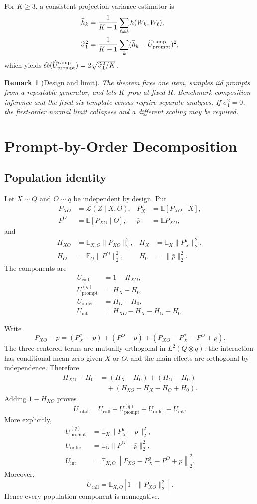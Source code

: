 \documentclass[letterpaper]{article}
\newtheorem{remark}{Remark}
\newcommand{\Law}{\mathcal L}
\newcommand{\E}{\mathbb E}
\newcommand{\1}{\mathbf 1}
\newcommand{\Up}{U_{\mathrm{prompt}}}
\newcommand{\Uc}{U_{\mathrm{call}}}
\newcommand{\Uo}{U_{\mathrm{order}}}
\newcommand{\Ui}{U_{\mathrm{int}}}
\newcommand{\Ut}{U_{\mathrm{total}}}
\begin{document}
For $K\ge3$, a consistent projection-variance estimator is
\begin{align}
\bar h_k&=\frac1{K-1}\sum_{\ell\ne k}h(W_k,W_\ell),\\
\widehat\sigma_1^2
&=\frac1{K-1}\sum_k(\bar h_k-\widehat\Up^{\rm samp})^2,
\end{align}
which yields
$\widehat{\operatorname{se}}(\widehat\Up^{\rm samp})
=2\sqrt{\widehat\sigma_1^2/K}$.

\begin{remark}[Design and limit]
The theorem fixes one item, samples iid prompts from a repeatable generator,
and lets $K$ grow at fixed $R$. Benchmark-composition inference and the fixed
six-template census require separate analyses. If $\sigma_1^2=0$, the
first-order normal limit collapses and a different scaling may be required.
\end{remark}

\section{Prompt-by-Order Decomposition}

\subsection{Population identity}

Let $X\sim Q$ and $O\sim q$ be independent by design. Put
\[
\begin{aligned}
P_{XO}&=\Law(Z\mid X,O),&
P_X^q&=\E[P_{XO}\mid X],\\
P^O&=\E[P_{XO}\mid O],&
\bar p&=\E P_{XO},
\end{aligned}
\]
and
\begin{align}
H_{XO}&=\E_{X,O}\|P_{XO}\|_2^2,
&H_X&=\E_X\|P_X^q\|_2^2,\\
H_O&=\E_O\|P^O\|_2^2,
&H_0&=\|\bar p\|_2^2.
\end{align}
The components are
\begin{align}
\Uc&=1-H_{XO},\\
\Up^{(q)}&=H_X-H_0,\\
\Uo&=H_O-H_0,\\
\Ui&=H_{XO}-H_X-H_O+H_0.
\end{align}

Write
\[
P_{XO}-\bar p
=(P_X^q-\bar p)+(P^O-\bar p)
+(P_{XO}-P_X^q-P^O+\bar p).
\]
The three centered terms are mutually orthogonal in
$L^2(Q\otimes q)$: the interaction has conditional mean zero given $X$ or
$O$, and the main effects are orthogonal by independence. Therefore
\[
\begin{aligned}
H_{XO}-H_0
&=(H_X-H_0)+(H_O-H_0)\\
&\quad+(H_{XO}-H_X-H_O+H_0).
\end{aligned}
\]
Adding $1-H_{XO}$ proves
\[
\Ut=\Uc+\Up^{(q)}+\Uo+\Ui.
\]
More explicitly,
\[
\begin{aligned}
\Up^{(q)}
&=\E_X\|P_X^q-\bar p\|_2^2,\\
\Uo
&=\E_O\|P^O-\bar p\|_2^2,\\
\Ui
&=\E_{X,O}
\left\|P_{XO}-P_X^q-P^O+\bar p\right\|_2^2.
\end{aligned}
\]
Moreover,
\[
\Uc=\E_{X,O}\!\left[1-\|P_{XO}\|_2^2\right].
\]
Hence every population component is nonnegative.
\end{document}
